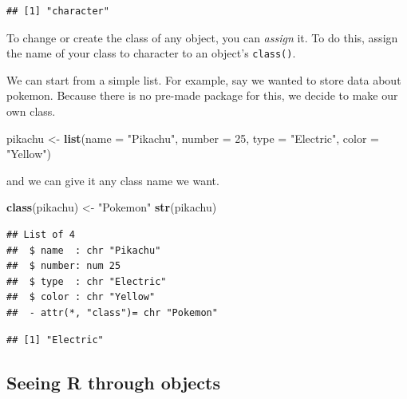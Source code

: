\documentclass[]{book}
\newenvironment{Shaded}{\begin{snugshade}}{\end{snugshade}}
\newcommand{\KeywordTok}[1]{\textcolor[rgb]{0.13,0.29,0.53}{\textbf{#1}}}
\newcommand{\DataTypeTok}[1]{\textcolor[rgb]{0.13,0.29,0.53}{#1}}
\newcommand{\DecValTok}[1]{\textcolor[rgb]{0.00,0.00,0.81}{#1}}
\newcommand{\StringTok}[1]{\textcolor[rgb]{0.31,0.60,0.02}{#1}}
\newcommand{\OperatorTok}[1]{\textcolor[rgb]{0.81,0.36,0.00}{\textbf{#1}}}
\newcommand{\NormalTok}[1]{#1}
\theoremstyle{definition}
\theoremstyle{definition}
\theoremstyle{definition}
\theoremstyle{remark}
\begin{document}
\begin{verbatim}
## [1] "character"
\end{verbatim}

To change or create the class of any object, you can \emph{assign} it.
To do this, assign the name of your class to character to an object's
\texttt{class()}.

We can start from a simple list. For example, say we wanted to store
data about pokemon. Because there is no pre-made package for this, we
decide to make our own class.

\begin{Shaded}
\begin{Highlighting}[]
\NormalTok{pikachu <-}\StringTok{ }\KeywordTok{list}\NormalTok{(}\DataTypeTok{name =} \StringTok{"Pikachu"}\NormalTok{,}
                \DataTypeTok{number =} \DecValTok{25}\NormalTok{,}
                \DataTypeTok{type =} \StringTok{"Electric"}\NormalTok{,}
                \DataTypeTok{color =} \StringTok{"Yellow"}\NormalTok{)}
\end{Highlighting}
\end{Shaded}

and we can give it any class name we want.

\begin{Shaded}
\begin{Highlighting}[]
\KeywordTok{class}\NormalTok{(pikachu) <-}\StringTok{ "Pokemon"}
\KeywordTok{str}\NormalTok{(pikachu)}
\end{Highlighting}
\end{Shaded}

\begin{verbatim}
## List of 4
##  $ name  : chr "Pikachu"
##  $ number: num 25
##  $ type  : chr "Electric"
##  $ color : chr "Yellow"
##  - attr(*, "class")= chr "Pokemon"
\end{verbatim}

\begin{Shaded}
\end{Shaded}

\begin{verbatim}
## [1] "Electric"
\end{verbatim}

\subsection{Seeing R through objects}\label{seeing-r-through-objects}
\end{document}
